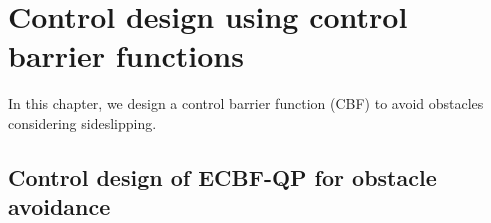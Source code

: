 
\section{Control design using control barrier functions}
\label{sec:control_design_using_CBF}
In this chapter, we design a control barrier function (CBF) to avoid obstacles considering sideslipping.
\subsection{Control design of ECBF-QP for obstacle avoidance}
\label{subsec:obstQP_roll_torque}

